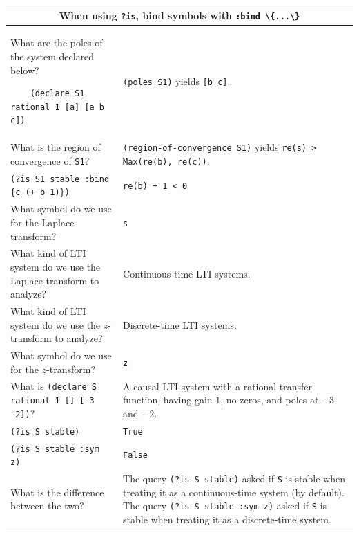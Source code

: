 \documentclass[11pt,letter]{article}
\begin{document}
\begin{longtable}{ p{} p{} }
  \midrule

  \multicolumn{2}{c}{\Large When using \lstinline!?is!, bind symbols with \lstinline!:bind \{...\}!} \\

  \midrule

  What are the poles of the system declared below?
  \begin{lstlisting}
    (declare S1 rational 1 [a] [a b c])
  \end{lstlisting}
  &
  \lstinline!(poles S1)! yields \lstinline![b c]!. \\

  What is the region of convergence of \lstinline!S1!?
  &
  \lstinline!(region-of-convergence S1)! yields \lstinline!re(s) > Max(re(b), re(c))!. \\

  \lstinline!(?is S1 stable :bind {c (+ b 1)})!
  &
  \lstinline!re(b) + 1 < 0! \\

  \midrule
  \midrule

  What symbol do we use for the Laplace transform?
  &
  \lstinline!s! \\

  What kind of LTI system do we use the Laplace transform to analyze?
  &
  Continuous-time LTI systems. \\

  What kind of LTI system do we use the $z$-transform to analyze?
  &
  Discrete-time LTI systems. \\

  What symbol do we use for the $z$-transform?
  &
  \lstinline!z! \\

  What is \lstinline!(declare S rational 1 [] [-3 -2])!?
  &
  A causal LTI system with a rational transfer function, having gain $1$, no zeros, and poles at $-3$ and $-2$. \\

  \lstinline!(?is S stable)!
  &
  \lstinline!True! \\

  \lstinline!(?is S stable :sym z)!
  &
  \lstinline!False! \\

  What is the difference between the two?
  &
  The query \lstinline!(?is S stable)! asked if \lstinline!S! is stable when treating it as a continuous-time system (by default).
  The query \lstinline!(?is S stable :sym z)! asked if \lstinline!S! is stable when treating it as a discrete-time system. \\


\end{longtable}
\end{document}
